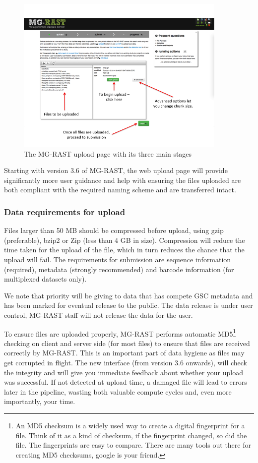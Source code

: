 \documentclass[12pt,fullpage]{report}
\begin{document}
\begin{figure}
\begin{center} 
\includegraphics[width=4in]{Images/upload_button.png} 
\end{center} 
\label{fig:upload_button} 
\caption{The MG-RAST upload page with its three main stages}
\end{figure}

Starting with version 3.6 of MG-RAST, the web upload page will provide significantly more user guidance and help with ensuring the files uploaded are both compliant with the required naming scheme and are transferred intact.

\subsubsection{Data requirements for upload}

Files larger than 50 MB should be compressed before upload, using gzip (preferable), bzip2 or Zip (less than 4 GB in size). Compression will reduce the time taken for the upload of the file, which in turn reduces the chance that the upload will fail. The requirements for submission are sequence information (required), metadata (strongly recommended) and barcode information (for multiplexed datasets only). 

We note that priority will be giving to data that has compete GSC metadata and has been marked for eventual release to the public. The data release is under user control, MG-RAST staff will not release the data for the user.

To ensure files are uploaded properly, MG-RAST performs automatic MD5\footnote{An MD5 checksum is a widely used way to create a digital fingerprint for a file. Think of it as a kind of checksum, if the fingerprint changed, so did the file. The fingerprints are easy to compare. There are many tools out there for creating MD5 checksums, google is your friend.} checking on client and server side (for most files) to ensure that files are received correctly by MG-RAST.  This is an important part of data hygiene as files may get corrupted in flight. The new interface (from version 3.6 onwards), will check the integrity and will give you immediate feedback about whether your upload was successful.  If not detected at upload time, a damaged file will lead to errors later in the pipeline, wasting both valuable compute cycles and, even more importantly, your time. 
\end{document}
